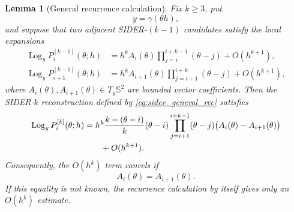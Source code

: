 \documentclass[a4paper,11pt]{article}
\newcommand{\bS}{\mathbb{S}}
\newcommand{\Log}{\operatorname{Log}}
\newtheorem{lemma}{Lemma}
\numberwithin{equation}{section}
\begin{document}
\begin{lemma}[General recurrence calculation]
\label{lem:recurrence_calculation}
Fix \(k\geq3\), put
\[
        y=\gamma(\theta h),
\]
and suppose that two adjacent SIDER-\((k-1)\) candidates satisfy the local
expansions
\begin{align}
\Log_y P_i^{[k-1]}(\theta;h)
&=
h^k A_i(\theta)
        \prod_{j=i}^{i+k-1}(\theta-j)
+
O(h^{k+1}),                                           \label{eq:Ai}\\
\Log_y P_{i+1}^{[k-1]}(\theta;h)
&=
h^k A_{i+1}(\theta)
        \prod_{j=i+1}^{i+k}(\theta-j)
+
O(h^{k+1}),                                           \label{eq:Aip1}
\end{align}
where \(A_i(\theta),A_{i+1}(\theta)\in T_y\bS^2\) are bounded vector
coefficients.  Then the SIDER-\(k\) reconstruction defined by
\eqref{eq:sider_general_rec} satisfies
\begin{align}
\Log_y P_i^{[k]}(\theta;h)
&=
h^k
\frac{k-(\theta-i)}{k}
(\theta-i)
\prod_{j=i+1}^{i+k-1}(\theta-j)
\bigl(A_i(\theta)-A_{i+1}(\theta)\bigr)       \notag\\
&\qquad +O(h^{k+1}).                           \label{eq:recurrence_gap}
\end{align}
Consequently, the \(O(h^k)\) term cancels if
\[
        A_i(\theta)=A_{i+1}(\theta).
\]
If this equality is not known, the recurrence calculation by itself gives
only an \(O(h^k)\) estimate.
\end{lemma}
\end{document}
